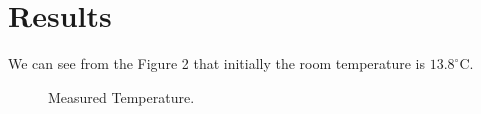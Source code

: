 \documentclass[12pt]{article}
\begin{document}
\section{Results}
We can see from the Figure 2 that initially the room temperature is $13.8^{\circ} $C.
\begin{figure}[htb]
\centering
{}
\caption{Measured Temperature.}
\end{figure}
\end{document}
